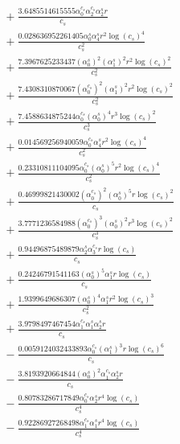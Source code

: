 \documentclass[10pt]{article}
\begin{document}
\begin{align*}
&{}  + \frac{3.6485514615555 \alpha_{0}^{c_s} \alpha_{2}^{c_s} \alpha_{2}^s r}{c_{s}} \\
&{}  + \frac{0.028636952261405 \alpha_{0}^s \alpha_{4}^s r^{2} \log{\left(c_{s} \right)}^{4}}{c_{s}^{2}} \\
&{}  + \frac{7.3967625233437 \left(\alpha_{0}^s\right)^{2} \left(\alpha_{1}^s\right)^{2} r^{2} \log{\left(c_{s} \right)}^{2}}{c_{s}^{2}} \\
&{}  + \frac{7.4308310870067 \left(\alpha_{0}^{c_s}\right)^{2} \left(\alpha_{1}^s\right)^{2} r^{2} \log{\left(c_{s} \right)}^{2}}{c_{s}^{2}} \\
&{}  + \frac{7.4588634875244 \alpha_{0}^{c_s} \left(\alpha_{0}^s\right)^{4} r^{3} \log{\left(c_{s} \right)}^{2}}{c_{s}^{3}} \\
&{}  + \frac{0.014569256940059 \alpha_{0}^{c_s} \alpha_{4}^s r^{2} \log{\left(c_{s} \right)}^{4}}{c_{s}^{2}} \\
&{}  + \frac{0.23310811104095 \alpha_{0}^{c_s} \left(\alpha_{0}^s\right)^{5} r^{2} \log{\left(c_{s} \right)}^{4}}{c_{s}^{2}} \\
&{}  + \frac{0.46999821430002 \left(\alpha_{0}^{c_s}\right)^{2} \left(\alpha_{0}^s\right)^{5} r \log{\left(c_{s} \right)}^{2}}{c_{s}} \\
&{}  + \frac{3.7771236584988 \left(\alpha_{0}^{c_s}\right)^{3} \left(\alpha_{0}^s\right)^{2} r^{3} \log{\left(c_{s} \right)}^{2}}{c_{s}^{3}} \\
&{}  + \frac{0.94496875489879 \alpha_{2}^s \alpha_{3}^{c_s} r \log{\left(c_{s} \right)}}{c_{s}} \\
&{}  + \frac{0.24246791541163 \left(\alpha_{0}^s\right)^{5} \alpha_{1}^s r \log{\left(c_{s} \right)}}{c_{s}} \\
&{}  + \frac{1.9399649686307 \left(\alpha_{0}^s\right)^{4} \alpha_{1}^s r^{2} \log{\left(c_{s} \right)}^{3}}{c_{s}^{2}} \\
&{}  + \frac{3.9798497467454 \alpha_{1}^{c_s} \alpha_{1}^s \alpha_{2}^s r}{c_{s}} \\
&{}  - \frac{0.0059124032433893 \alpha_{0}^{c_s} \left(\alpha_{1}^s\right)^{3} r \log{\left(c_{s} \right)}^{6}}{c_{s}} \\
&{}  - \frac{3.8193920664844 \left(\alpha_{0}^s\right)^{2} \alpha_{1}^{c_s} \alpha_{2}^s r}{c_{s}} \\
&{}  - \frac{0.80783286717849 \alpha_{0}^{c_s} \alpha_{2}^s r^{4} \log{\left(c_{s} \right)}}{c_{s}^{4}} \\
&{}  - \frac{0.92286927268498 \alpha_{1}^{c_s} \alpha_{1}^s r^{4} \log{\left(c_{s} \right)}}{c_{s}^{4}} \\

\end{align*}
\end{document}
